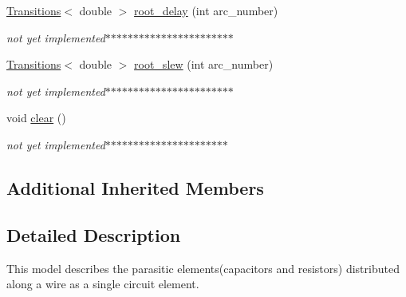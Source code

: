\begin{DoxyCompactItemize}
\hyperlink{classTransitions}{Transitions}$<$ double $>$ \hyperlink{classRCTreeWireDelayModel_a5575e4f4e598047dd87fee0707d135d3}{root\-\_\-delay} (int arc\-\_\-number)
\begin{DoxyCompactList}\small\item\em not yet implemented$\ast$$\ast$$\ast$$\ast$$\ast$$\ast$$\ast$$\ast$$\ast$$\ast$$\ast$$\ast$$\ast$$\ast$$\ast$$\ast$$\ast$$\ast$$\ast$$\ast$$\ast$$\ast$$\ast$ \end{DoxyCompactList}\item 
\hyperlink{classTransitions}{Transitions}$<$ double $>$ \hyperlink{classRCTreeWireDelayModel_aa314aa73bf2e25008d330ad19544e210}{root\-\_\-slew} (int arc\-\_\-number)
\begin{DoxyCompactList}\small\item\em not yet implemented$\ast$$\ast$$\ast$$\ast$$\ast$$\ast$$\ast$$\ast$$\ast$$\ast$$\ast$$\ast$$\ast$$\ast$$\ast$$\ast$$\ast$$\ast$$\ast$$\ast$$\ast$$\ast$$\ast$ \end{DoxyCompactList}\item 
void \hyperlink{classRCTreeWireDelayModel_acb14554ad26108d350770391b1923c51}{clear} ()
\begin{DoxyCompactList}\small\item\em not yet implemented$\ast$$\ast$$\ast$$\ast$$\ast$$\ast$$\ast$$\ast$$\ast$$\ast$$\ast$$\ast$$\ast$$\ast$$\ast$$\ast$$\ast$$\ast$$\ast$$\ast$$\ast$$\ast$ \end{DoxyCompactList}\end{DoxyCompactItemize}
\subsection*{Additional Inherited Members}


\subsection{Detailed Description}
This model describes the parasitic elements(capacitors and resistors) distributed along a wire as a single circuit element. 


